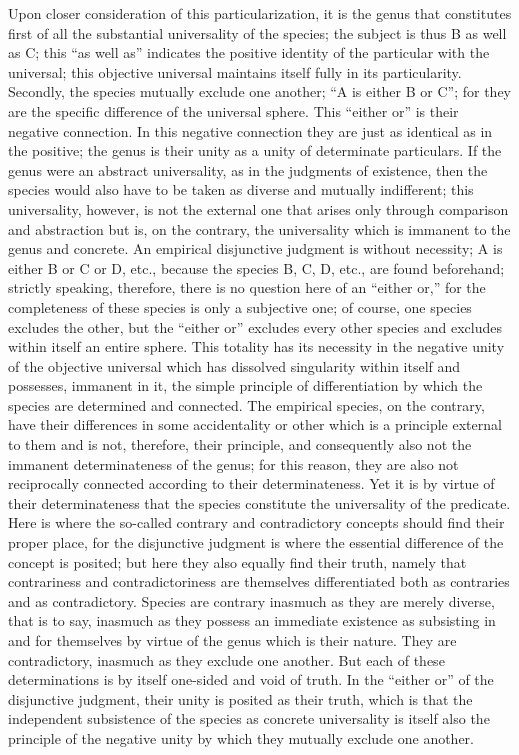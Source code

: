 Upon closer consideration of this particularization,
it is the genus that constitutes first of all
the substantial universality of the species;
the subject is thus B as well as C;
this “as well as” indicates the positive identity of
the particular with the universal;
this objective universal maintains itself
fully in its particularity.
Secondly, the species mutually exclude one another;
“A is either B or C”;
for they are the specific difference of the universal sphere.
This “either or” is their negative connection.
In this negative connection
they are just as identical as in the positive;
the genus is their unity as
a unity of determinate particulars.
If the genus were an abstract universality,
as in the judgments of existence,
then the species would also have to
be taken as diverse and mutually indifferent;
this universality, however, is
not the external one that arises only
through comparison and abstraction
but is, on the contrary, the universality
which is immanent to the genus and concrete.
An empirical disjunctive judgment is without necessity;
A is either B or C or D, etc.,
because the species B, C, D, etc.,
are found beforehand;
strictly speaking, therefore, there is
no question here of an “either or,”
for the completeness of these species is only a subjective one;
of course, one species excludes the other,
but the “either or” excludes
every other species and excludes within itself an entire sphere.
This totality has its necessity in
the negative unity of the objective universal
which has dissolved singularity within itself
and possesses, immanent in it,
the simple principle of differentiation
by which the species are determined and connected.
The empirical species, on the contrary,
have their differences in some accidentality
or other which is a principle external to them
and is not, therefore, their principle,
and consequently also not the immanent
determinateness of the genus;
for this reason, they are also not reciprocally
connected according to their determinateness.
Yet it is by virtue of their determinateness
that the species constitute the universality of the predicate.
Here is where the so-called
contrary and contradictory concepts
should find their proper place,
for the disjunctive judgment is
where the essential difference of the concept is posited;
but here they also equally find their truth,
namely that contrariness and contradictoriness are themselves
differentiated both as contraries and as contradictory.
Species are contrary inasmuch as they are merely diverse,
that is to say, inasmuch as they possess an immediate existence
as subsisting in and for themselves by virtue of
the genus which is their nature.
They are contradictory, inasmuch as they exclude one another.
But each of these determinations is
by itself one-sided and void of truth.
In the “either or” of the disjunctive judgment,
their unity is posited as their truth,
which is that the independent subsistence of
the species as concrete universality is
itself also the principle of the negative unity
by which they mutually exclude one another.

